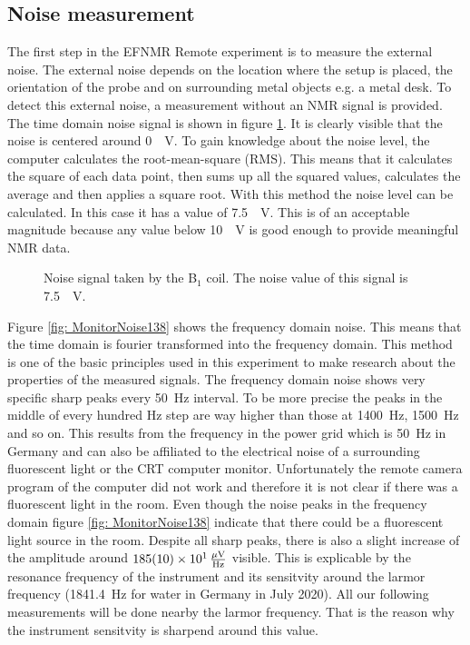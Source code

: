 \subsection{Noise measurement}
\label{sec:Noisemeasurement}
The first step in the EFNMR Remote experiment is to measure the external noise.
The external noise depends on the location where the setup is placed, the orientation of the probe and on surrounding metal objects e.g. a metal desk.
To detect this external noise, a measurement without an NMR signal is provided.
The time domain noise signal is shown in figure \ref{fig: noise}.
It is clearly visible that the noise is centered around \SI{0}{\mu \volt}.
To gain knowledge about the noise level, the computer calculates the root-mean-square (RMS).
This means that it calculates the square of each data point, then sums up all the squared values, calculates the average and then applies a square root.
With this method the noise level can be calculated.
In this case it has a value of \SI{7.5}{\mu \volt}.
This is of an acceptable magnitude because any value below \SI{10}{\mu \volt} is good enough to provide meaningful NMR data.

\begin{figure}[H]
    \centering
    
    \caption[Noise signal taken by the B$_1$ coil.]{Noise signal taken by the B$_1$ coil.
    The noise value of this signal is \SI{7.5}{\mu \volt}.}
    \label{fig: noise}
\end{figure}

Figure \ref{fig: MonitorNoise138} shows the frequency domain noise.
This means that the time domain is fourier transformed into the frequency domain.
This method is one of the basic principles used in this experiment to make research about the properties of the measured signals.
The frequency domain noise shows very specific sharp peaks every \SI{50}{\hertz} interval.
To be more precise the peaks in the middle of every hundred \si{\hertz} step are way higher than those at \SI{1400}{\hertz}, \SI{1500}{\hertz} and so on.
This results from the frequency in the power grid which is \SI{50}{\hertz} in Germany and can also be affiliated to the electrical noise of a surrounding fluorescent light or the CRT computer monitor.
Unfortunately the remote camera program of the computer did not work and therefore it is not clear if there was a fluorescent light in the room.
Even though the noise peaks in the frequency domain figure \ref{fig: MonitorNoise138} indicate that there could be a fluorescent light source in the room.
Despite all sharp peaks, there is also a slight increase of the amplitude around $\SI{185 \pm 10 e1}{\frac{\mu \volt}{\hertz}}$ visible.
This is explicable by the resonance frequency of the instrument and its sensitvity around the larmor frequency (\SI{1841.4}{\hertz} for water in Germany in July 2020).
All our following measurements will be done nearby the larmor frequency.
That is the reason why the instrument sensitvity is sharpend around this value.

